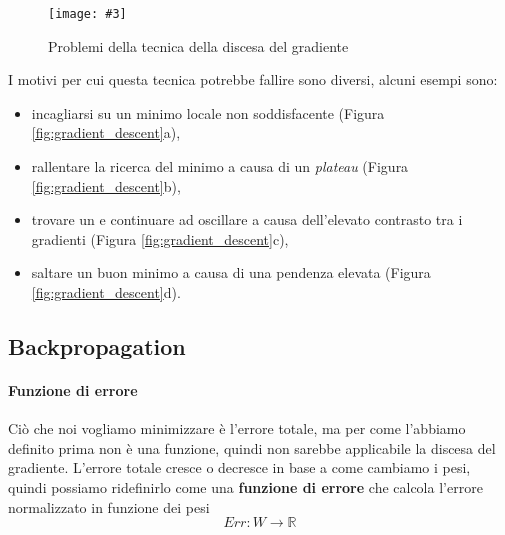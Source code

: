 \documentclass[12pt, twoside, letterpaper]{report}
\newcommand{\img}[4] {
	\begin{figure}
		\centering
		\texttt{[image: \#3]}\\
		\caption{#1}
		\label{fig:#4}
	\end{figure}
}
\begin{document}
				\img{Problemi della tecnica della discesa del gradiente \cite{kriesel}}{0.4}{gradient_descent.png}{gradient_descent_problemi}
				
				I motivi per cui questa tecnica potrebbe fallire sono diversi, alcuni esempi sono: 
				\begin{itemize}
				 	\item incagliarsi su un minimo locale non soddisfacente (Figura \ref{fig:gradient_descent}a),
				 	\item rallentare la ricerca del minimo a causa di un \textit{plateau} (Figura \ref{fig:gradient_descent}b),
				 	\item trovare un  e continuare ad oscillare a causa dell'elevato contrasto tra i gradienti (Figura \ref{fig:gradient_descent}c),
				 	\item saltare un buon minimo a causa di una pendenza elevata (Figura \ref{fig:gradient_descent}d).
				 \end{itemize} 
				 
				 
			\subsection{Backpropagation}


					
				\paragraph{Funzione di errore} Ciò che noi vogliamo minimizzare è l'errore totale, ma per come l'abbiamo definito prima non è una funzione, quindi non sarebbe applicabile la discesa del gradiente. L'errore totale cresce o decresce in base a come cambiamo i pesi, quindi possiamo ridefinirlo come una \textbf{funzione di errore} che calcola l'errore normalizzato in funzione dei pesi $$Err : W \rightarrow \mathbb{R}$$ 
\end{document}
